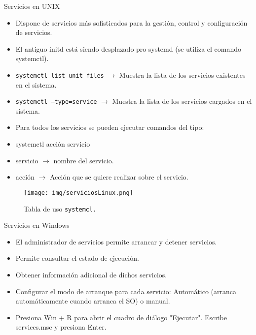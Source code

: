 \documentclass{beamer}
\begin{document}
\begin{frame}{Servicios en UNIX}
\begin{itemize}
\item Dispone de servicios más sofisticados para la gestión, control y
configuración de servicios.
\item El antiguo initd está siendo desplazado pro systemd (se utiliza el comando
systemctl).
\item \texttt{systemctl list-unit-files} $\to$ Muestra la lista de los servicios existentes en el sistema.
\item \texttt{systemctl --type=service} $\to$ Muestra la lista de los servicios cargados en el sistema.
\item Para todos los servicios se pueden ejecutar comandos del tipo:
\item systemctl acción servicio
\item servicio $\to$ nombre del servicio.
\item acción $\to$ Acción que se quiere realizar sobre el servicio.
\end{itemize}
\end{frame}

\begin{frame}
    \begin{figure}
        \centering
        \texttt{[image: img/serviciosLinux.png]} 
        \caption{Tabla de uso \texttt{systemcl.}}
    \end{figure}
\end{frame}




\begin{frame}{Servicios en Windows}
    \begin{itemize}
        \item El administrador de servicios permite arrancar y detener servicios.
        \item Permite consultar el estado de ejecución.
        \item Obtener información adicional de dichos servicios.
        \item Configurar el modo de arranque para cada servicio: Automático (arranca automáticamente cuando arranca el SO) o manual.
        \item Presiona Win + R para abrir el cuadro de diálogo "Ejecutar". Escribe services.msc y presiona Enter.
    \end{itemize}
\end{frame}
\end{document}
